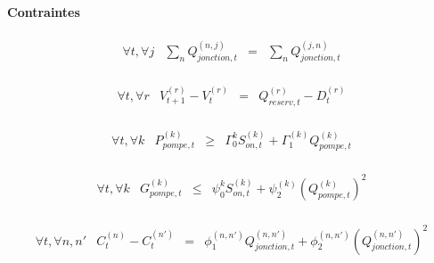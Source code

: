 \documentclass{article}
\begin{document}
\paragraph{Contraintes}
\begin{equation}
    \tag{Equilibre flux}  
    \left.
        \begin{array}{lcccc}
            \forall t,\forall j   &   \sum_{n} Q_{jonction,t}^{(n,j)}    & = &   \sum_{n} Q_{jonction,t}^{(j,n)}\\[0.2cm]
        \end{array}
    \right.
\end{equation}

\begin{equation}
    \tag{Satisfaction demande}  
    \left.
        \begin{array}{lcccc}
            \forall t, \forall r   &   V_{t+1}^{(r)}-V_t^{(r)}     & = &   Q_{reserv,t}^{(r)} - D_t^{(r)}\\[0.2cm]
        \end{array}
    \right.
\end{equation}
    
\begin{equation}
    \tag{Conso. élec pompe}  
    \left.
        \begin{array}{lccc}
            \forall t, \forall k   &   P_{pompe,t}^{(k)}     & \geq &   \Gamma_0^{k}S_{on,t}^{(k)} + \Gamma_1^{(k)}Q_{pompe,t}^{(k)}\\[0.2cm]
        \end{array}
    \right.
\end{equation}

\begin{equation}
    \tag{Gain charge pompe}
    \left.
        \begin{array}{lccc}
            \forall t, \forall k   &   G_{pompe,t}^{(k)}     & \leq &   \psi_0^{k}S_{on,t}^{(k)} + \psi_2^{(k)}(Q_{pompe,t}^{(k)})^2\\[0.2cm]
        \end{array}
    \right.
\end{equation}

\begin{equation}
    \tag{Perte charge flux}
    \left.
        \begin{array}{lcccc}
            \forall t, \forall n,n'   &   C_t^{(n)}  - C_t^{(n')}    & = &   \phi_1^{(n,n')}Q_{jonction,t}^{(n,n')} + \phi_2^{(n,n')}(Q_{jonction,t}^{(n,n')})^2\\[0.2cm]
        \end{array}
    \right.
\end{equation}
\end{document}
